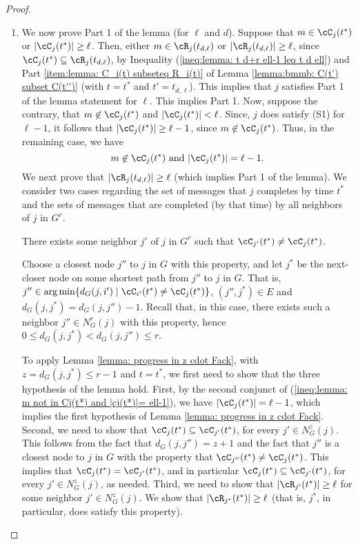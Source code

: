 \begin{proof}
\begin{enumerate}
\item We now prove Part 1 of the lemma (for $\ell$ and $d$).
Suppose that $m\in \cC_j(t^*)$  or $|\cC_{j}(t^*)| \geq \ell$.
Then, either
$m\in \cR_{j}(t_{d,\ell})$ or $|\cR_{j}(t_{d,\ell})| \geq \ell $,
since $\cC_{j}(t^*) \subseteq \cR_{j}(t_{d,\ell})$,
by Inequality (\ref{ineq:lemma: t d+r ell-1 leq t d ell}) and Part \ref{item:lemma: C_i(t) subseteq R_i(t)} of Lemma \ref{lemma:bmmb: C(t') subset C(t'')}
(with $t=t^*$ and $t'= t_{d,\ell}$).
This implies that $j$ satisfies Part 1 of the lemma statement for $\ell$. This implies Part 1.
Now, suppose the contrary, that $m\not\in \cC_j(t^*)$ and $|\cC_{j}(t^*)| < \ell$.
Since, $j$ does satisfy (S1) for $\ell-1$, it follows that $|\cC_{j}(t^*)| \geq \ell-1$,  since $m\not\in \cC_j(t^*)$.
Thus, in the remaining case, we have
\begin{equation}
m\not\in \cC_j(t^*) \mbox{ and } |\cC_{j}(t^*)| = \ell-1.
\label{ineq:lemma: m not in Cj(t*) and |cj(t*)|= ell-1}
\end{equation}
We next prove that $|\cR_{j}(t_{d,\ell})| \geq \ell$ (which implies Part 1 of the lemma).
We consider two cases regarding the set of messages that $j$ completes by time $t^*$
and the sets of messages that are completed (by that time) by all neighbors of $j$ in $G^r$.



 There exists some neighbor $j'$ of $j$ in $G^r$ such that $\cC_{j'}(t^*) \not =  \cC_j(t^*)$.


Choose a closest node $j''$ to $j$ in $G$ with this property, and let $j^*$
be the next-closer node on some shortest path from $j''$ to $j$ in $G$.
That is,
$j'' \in \arg\min\{d_G(j,i') \mid \cC_{i'}(t^*)\not= \cC_{j}(t^*) \}$, $(j'',j^*)\in E$ and $d_G(j,j^*)=d_G(j,j'')-1$.
Recall that, in this case, there exists such a neighbor $j''\in N^r_G(j)$ with this property, hence $0\leq d_G(j,j^*)<d_G(j,j'')\leq r$.


To apply Lemma \ref{lemma: progress in z cdot Fack}, with $z = d_G(j,j^*)\leq r-1$ and $t = t^*$, we first need to show that the three hypothesis of the lemma hold.
First, by the second conjunct of (\ref{ineq:lemma: m not in Cj(t*) and |cj(t*)|= ell-1}),
we have $|\cC_{j}(t^*)| = \ell-1$, which implies the first hypothesis of Lemma
\ref{lemma: progress in z cdot Fack}.
Second,
we need to show that $\cC_{j}(t^*) \subseteq \cC_{j'}(t^*)$, for every $j' \in N_G^z(j)$.
This follows from the fact that $d_G(j,j'')=z+1$ and the fact that $j''$ is a closest node to $j$ in $G$ with the property that $\cC_{j''}(t^*) \neq \cC_{j}(t^*)$.
This implies that $\cC_{j}(t^*) = \cC_{j'}(t^*)$, and in particular $\cC_{j}(t^*) \subseteq \cC_{j'}(t^*)$, for every $j' \in N_G^z(j)$, as needed.
Third, we need to show that $|\cR_{j'}(t^*)|\geq \ell$ for some neighbor $j' \in N^z_G(j)$.
We show that $|\cR_{j^*}(t^*)|\geq \ell$ (that is, $j^*$, in particular, does satisfy this property).



\end{enumerate}
\end{proof}
